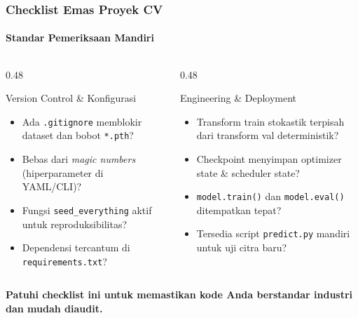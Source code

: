 \documentclass[t,aspectratio=169,xcolor=dvipsnames]{beamer}
\begin{document}
\begin{frame}
  \frametitle{Checklist Emas Proyek CV}
  \framesubtitle{Standar Pemeriksaan Mandiri}

  \begin{columns}[t]
    \begin{column}{0.48\textwidth}
      \begin{block}{Version Control \& Konfigurasi}
        \footnotesize
        \begin{itemize}\setlength{\itemsep}{2pt}
          \item[\checkmark] Ada \texttt{.gitignore} memblokir dataset dan bobot \texttt{*.pth}?
          \item[\checkmark] Bebas dari \textit{magic numbers} (hiperparameter di YAML/CLI)?
          \item[\checkmark] Fungsi \texttt{seed\_everything} aktif untuk reproduksibilitas?
          \item[\checkmark] Dependensi tercantum di \texttt{requirements.txt}?
        \end{itemize}
      \end{block}
    \end{column}

    \begin{column}{0.48\textwidth}
      \begin{block}{Engineering \& Deployment}
        \footnotesize
        \begin{itemize}\setlength{\itemsep}{2pt}
          \item[\checkmark] Transform train stokastik terpisah dari transform val deterministik?
          \item[\checkmark] Checkpoint menyimpan optimizer state \& scheduler state?
          \item[\checkmark] \texttt{model.train()} dan \texttt{model.eval()} ditempatkan tepat?
          \item[\checkmark] Tersedia script \texttt{predict.py} mandiri untuk uji citra baru?
        \end{itemize}
      \end{block}
    \end{column}
  \end{columns}

  \vspace{0.2cm}
  \centering
  \footnotesize\textbf{Patuhi checklist ini untuk memastikan kode Anda berstandar industri dan mudah diaudit.}
\end{frame}
\end{document}
